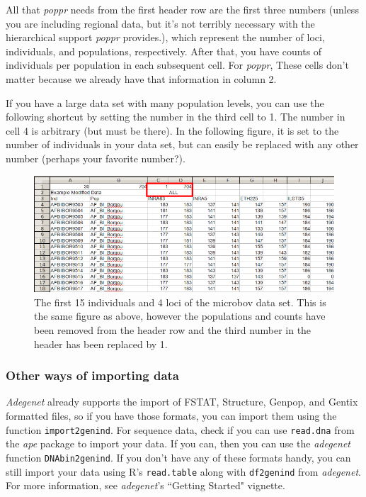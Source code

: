 \documentclass[letterpaper]{article}
\newcommand{\tab}{\hspace*{1em}}
\begin{document}
\newpage
All that \textit{poppr} needs from the first header row are the first three numbers (unless you are including regional data, but it's not terribly necessary with the hierarchical support \textit{poppr} provides.), which represent the number of loci, individuals, and populations, respectively. After that, you have counts of individuals per population in each subsequent cell. For \textit{poppr}, These cells don't matter because we already have that information in column 2.

If you have a large data set with many population levels, you can use the following shortcut by setting the number in the third cell to 1. The number in cell 4 is arbitrary (but must be there). In the following figure, it is set to the number of individuals in your data set, but can easily be replaced with any other number (perhaps your favorite number?). 

\begin{figure}[h!]
  \centering
  \caption{\footnotesize \footnotesize The first 15 individuals and 4 loci of the microbov data set. This is the same figure as above, however the populations and counts have been removed from the header row and the third number in the header has been replaced by 1.}
\includegraphics{mod_dat}
\end{figure}


\subsubsection{Other ways of importing data}\label{intro:import:other}

\tab\tab \textit{Adegenet} already supports the import of FSTAT, Structure, Genpop, and Gentix formatted files, so if you have those formats, you can import them using the function \texttt{import2genind}. For sequence data, check if you can use \texttt{read.dna} from the \textit{ape} package to import your data. If you can, then you can use the \textit{adegenet} function \texttt{DNAbin2genind}. If you don't have any of these formats handy, you can still import your data using R's \texttt{read.table} along with \texttt{df2genind} from \textit{adegenet}. For more information, see \textit{adegenet}'s ``Getting Started" vignette.
\end{document}
